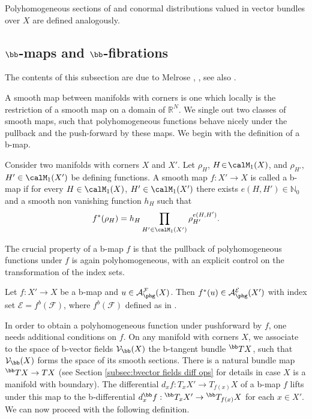 Polyhomogeneous sections of and conormal distributions valued in vector bundles over $X$ are defined analogously.

\subsection{\texorpdfstring{$\bb$}{b}-maps and \texorpdfstring{$\bb$}{b}-fibrations}
The contents of this subsection are due to Melrose \cite{Mel:CCDMWC}, \cite{melrose1993atiyah}, see also
\cite[\S 2.A]{mazzeorafe1991elliptic}.

A smooth map between manifolds with corners is
one which locally is the restriction of a smooth map on a
domain of $\mathbb{R}^{N}$. We single out two classes of smooth maps,
such that polyhomogeneous functions behave nicely under the pullback and the push-forward
by these maps. We begin with the definition of a b-map.

\begin{defn} Consider two manifolds with corners $X$ and $X'$.
Let $\rho_H$, \hbox{$H\!\in\!\calM_1(X)$}, and $\rho_{H'}$, $H'\in\calM_1(X')$ be defining functions. A smooth map $f : X' \to X$ is called a b-map
if for every $H\in\calM_1(X)$, $H'\in\calM_1(X')$ there exists $e(H,H') \in \mathbb{N}_0$
and a smooth non vanishing function $h_H$ such that
\begin{equation} \label{hypb}
f^{*}(\rho_{H}) = h_H \prod_{H'\in\calM_1(X')} \rho_{H'}^{e(H,H')}.
\end{equation}
\end{defn}

The crucial property of a b-map $f$ is that the pullback of polyhomogeneous
functions under $f$ is again polyhomogeneous, with an explicit
control on the transformation of the index sets.

\begin{Prop}
Let $f : X' \to X $ be a b-map and
$ u \in \mathcal{A}_{\phg}^{\mathcal{F}}(X)$.
Then $f^{*}(u) \in \mathcal{A}_{\phg}^{\mathcal{E}}(X')$
with index set $\mathcal{E} = f^{b}(\mathcal{F})$,
where $f^{b}(\mathcal{F})$ defined as in
\cite[A12]{mazzeorafe1991elliptic}.
\end{Prop}

In order to obtain a polyhomogeneous function
under pushforward by $f$, one needs additional conditions on $f$.
On any manifold with corners $X$, we associate to the space of b-vector
fields $\mathcal{V}_\bb(X)$ the b-tangent bundle ${}^\bb TX$, such that $\mathcal{V}_\bb(X)$
forms the space of its smooth sections. There is a natural bundle map ${}^\bb TX\to TX$ (see Section \ref{subsec:bvector fields diff ops} for details in case $X$ is a manifold with boundary).
The differential
$d_{x}f: T_{x}X' \to T_{f(x)}X$ of a b-map $f$ lifts under this map to the b-differential $d^{\bb}_{x}f : {}^{\bb}T_{x} X' \to {}^\bb T_{f(x)} X$ for each $x \in X'$. We can now proceed with the following definition.

